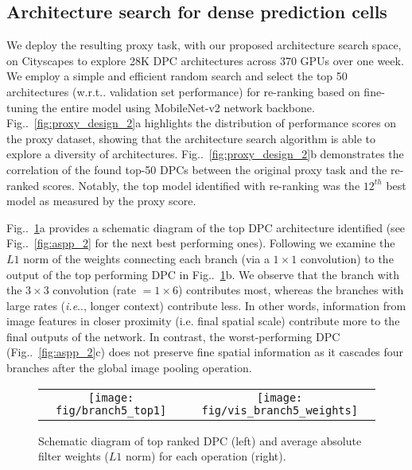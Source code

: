 \documentclass{article}
\makeatletter
\def\@onedot{\ifx\@let@token.\else.\null\fi\xspace}
\DeclareRobustCommand\onedot{\futurelet\@let@token\@onedot}
\newcommand{\figref}[1]{Fig\onedot~\ref{#1}}
\def\ie{\emph{i.e}\onedot} \def\Ie{\emph{I.e}\onedot}
\def\wrt{w.r.t\onedot} \def\dof{d.o.f\onedot}
\makeatother
\begin{document}
\subsection{Architecture search for dense prediction cells}

We deploy the resulting proxy task, with our proposed architecture search space, on Cityscapes to explore 28K DPC architectures across 370 GPUs over one week. We employ a simple and efficient random search \cite{bergstra2012random, golovin2017google} and select the top 50 architectures (\wrt validation set performance) for re-ranking based on fine-tuning the entire model using MobileNet-v2 network backbone. \figref{fig:proxy_design_2}a highlights the distribution of performance scores on the proxy dataset, showing that the architecture search algorithm is able to explore a diversity of architectures. \figref{fig:proxy_design_2}b demonstrates the correlation of the found top-50 DPCs between the original proxy task and the re-ranked scores. Notably, the top model identified with re-ranking was the $12^{th}$ best model as measured by the proxy score.






\figref{fig:aspp}a provides a schematic diagram of the top DPC architecture identified (see \figref{fig:aspp_2} for the next best performing ones). Following \cite{huang2017densely} we examine the $L1$ norm of the weights connecting each branch (via a $1\times1$ convolution) to the output of the top performing DPC in \figref{fig:aspp}b. We observe that the branch with the $3\times3$ convolution (rate $=1\times6$) contributes most, whereas the branches with large rates (\ie, longer context) contribute less. In other words, information from image features in closer proximity (i.e. final spatial scale) contribute more to the final outputs of the network. In contrast, the worst-performing DPC (\figref{fig:aspp_2}c) does not preserve fine spatial information as it cascades four branches after the global image pooling operation.




\begin{figure}[!t]
  \centering
  \begin{tabular}{c c}
    \texttt{[image: fig/branch5\_top1]} &
    \texttt{[image: fig/vis\_branch5\_weights]} \\
\end{tabular}
  \caption{Schematic diagram of top ranked DPC (left) and average absolute filter weights ($L1$ norm) for each operation (right).}
  \label{fig:aspp}
\end{figure}
\end{document}
